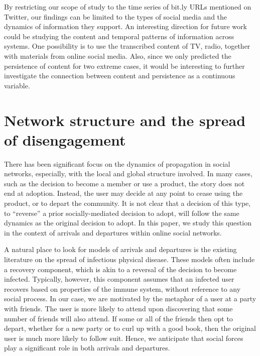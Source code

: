 \documentclass[phd,tocprelim]{cornell}
\begin{document}
By restricting our scope of study to the time series of bit.ly URLs mentioned on Twitter, our findings can be limited to the types of social media and the dynamics of information they support. An interesting direction for future work could be studying the content and temporal patterns of information across systems. One possibility is to use the transcribed content of TV, radio, together with materials from online social media. Also, since we only predicted the persistence of content for two extreme cases, it would be interesting to further investigate the connection between content and persistence as a continuous variable.


\chapter{Network structure and the spread of disengagement}
\label{chap:network}


There has been significant focus on the dynamics of propagation in social networks, especially, with the local and global structure involved\cite{Newman:2002,Dodds:2005,Bakshy-2011,Leskovec:2007,Backstrom:2006,Romero-2011,Nowell-2008,Gruhl-2004}. In many cases, such as the decision to become a member or use a product, the story does not end at
adoption.  Instead, the user may decide at any point to cease using
the product, or to depart the community.  It is not clear that a
decision of this type, to ``reverse'' a prior socially-mediated
decision to adopt, will follow the same dynamics as the original
decision to adopt.  In this paper, we study this question in the
context of arrivals and departures within online social networks.

A natural place to look for models of arrivals and departures is the
existing literature on the spread of infectious physical disease.
These models often include a recovery component\cite{Newman:2002,
  Dodds:2005}, which is akin to a reversal of the decision to become
infected.  Typically, however, this component assumes that an infected
user recovers based on properties of the immune system, without
reference to any social process.  In our case, we are motivated by the
metaphor of a user at a party with friends.  The user is more likely
to attend upon discovering that some number of friends will also
attend.  If some or all of the friends then opt to depart, whether for
a new party or to curl up with a good book, then the original user is
much more likely to follow suit.  Hence, we anticipate that social
forces play a significant role in both arrivals and departures.
\end{document}
